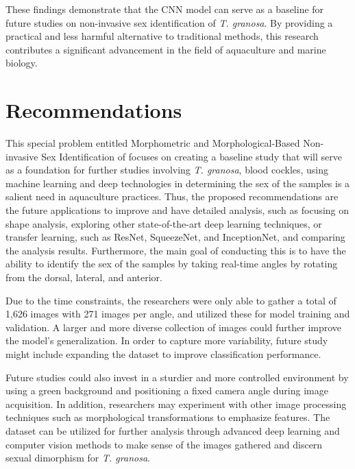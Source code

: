These findings demonstrate that the CNN model can serve as a baseline for future studies on non-invasive sex identification of \textit{T. granosa}. By providing a practical and less harmful alternative to traditional methods, this research contributes a significant advancement in the field of aquaculture and marine biology.

\section{Recommendations}

This special problem entitled Morphometric and Morphological-Based Non-invasive Sex Identification of \Tgranosa focuses on creating a baseline study that will serve as a foundation for further studies involving \textit{T. granosa}, blood cockles, using machine learning and deep technologies in determining the sex of the samples is a salient need in aquaculture practices. Thus, the proposed recommendations are the future applications to improve and have detailed analysis, such as focusing on shape analysis, exploring other state-of-the-art deep learning techniques, or transfer learning, such as ResNet, SqueezeNet, and InceptionNet, and comparing the analysis results. Furthermore, the main goal of conducting this is to have the ability to identify the sex of the samples by taking real-time angles by rotating from the dorsal, lateral, and anterior.

Due to the time constraints, the researchers were only able to gather a total of 1,626 images with 271 images per angle, and utilized these for model training and validation. A larger and more diverse collection of images could further improve the model’s generalization. In order to capture more variability, future study might include expanding the dataset to improve classification performance. 

Future studies could also invest in a sturdier and more controlled environment by using a green background and positioning a fixed camera angle during image acquisition. In addition, researchers may experiment with other image processing techniques such as morphological transformations to emphasize features. The dataset can be utilized for further analysis through advanced deep learning and computer vision methods to make sense of the images gathered and discern sexual dimorphism for \textit{T. granosa}. 